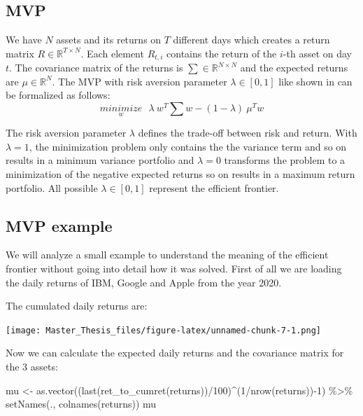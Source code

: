 \documentclass[
  oneside]{book}
\newenvironment{Shaded}{\begin{snugshade}}{\end{snugshade}}
\newcommand{\DecValTok}[1]{\textcolor[rgb]{0.00,0.00,0.81}{#1}}
\newcommand{\FunctionTok}[1]{\textcolor[rgb]{0.00,0.00,0.00}{#1}}
\newcommand{\NormalTok}[1]{#1}
\newcommand{\OtherTok}[1]{\textcolor[rgb]{0.56,0.35,0.01}{#1}}
\newcommand{\SpecialCharTok}[1]{\textcolor[rgb]{0.00,0.00,0.00}{#1}}
\begin{document}
\hypertarget{mvp}{%
\subsection{MVP}\label{mvp}}

We have \(N\) assets and its returns on \(T\) different days which creates a return matrix \(R \in \mathbb{R}^{T \times N}\). Each element \(R_{t,i}\) contains the return of the \(i\)-th asset on day \(t\). The covariance matrix of the returns is \(\textstyle\sum \in \mathbb{R}^{N \times N}\) and the expected returns are \(\mu \in \mathbb{R}^{N}\). The MVP with risk aversion parameter \(\lambda \in [0,1]\) like shown in \citep{Mari2005} can be formalized as follows:
\begin{equation} 
\underset{w}{minimize} \ \ \ \lambda \ w^T \textstyle\sum w - (1-\lambda) \ \mu^T w
\label{eq:MVP}
\end{equation}

The risk aversion parameter \(\lambda\) defines the trade-off between risk and return. With \(\lambda = 1\), the minimization problem only contains the the variance term and so on results in a minimum variance portfolio and \(\lambda = 0\) transforms the problem to a minimization of the negative expected returns so on results in a maximum return portfolio. All possible \(\lambda \in [0, 1]\) represent the efficient frontier.

\hypertarget{mvp-example}{%
\subsection{MVP example}\label{mvp-example}}

We will analyze a small example to understand the meaning of the efficient frontier without going into detail how it was solved. First of all we are loading the daily returns of IBM, Google and Apple from the year 2020.

The cumulated daily returns are:

\texttt{[image: Master\_Thesis\_files/figure-latex/unnamed-chunk-7-1.png]}

Now we can calculate the expected daily returns and the covariance matrix for the 3 assets:

\begin{Shaded}
\begin{Highlighting}[]
\NormalTok{mu }\OtherTok{\textless{}{-}} \FunctionTok{as.vector}\NormalTok{((}\FunctionTok{last}\NormalTok{(}\FunctionTok{ret\_to\_cumret}\NormalTok{(returns))}\SpecialCharTok{/}\DecValTok{100}\NormalTok{)}\SpecialCharTok{\^{}}\NormalTok{(}\DecValTok{1}\SpecialCharTok{/}\FunctionTok{nrow}\NormalTok{(returns))}\SpecialCharTok{{-}}\DecValTok{1}\NormalTok{) }\SpecialCharTok{\%\textgreater{}\%} 
  \FunctionTok{setNames}\NormalTok{(., }\FunctionTok{colnames}\NormalTok{(returns))}
\NormalTok{mu}
\end{Highlighting}
\end{Shaded}
\end{document}
